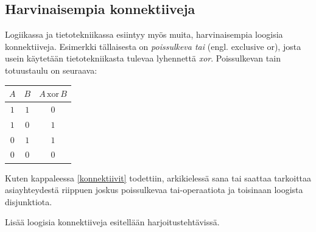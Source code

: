 \subsection*{Harvinaisempia konnektiiveja}%
Logiikassa ja tietotekniikassa esiintyy myös muita, harvinaisempia loogisia konnektiiveja. Esimerkki tällaisesta on {\em poissulkeva tai} (engl. exclusive or), josta usein käytetään tietotekniikasta tulevaa lyhennettä {\em xor}. Poissulkevan tain totuustaulu on seuraava:

\bigskip

\begin{center}
\begin{tabular}{|c|c|c|}\hline
$A$ & $B$ & $A\,\mathrm{xor}\,B$ \\ \hline
$1$ & $1$ & $0$\\ %
$1$ & $0$ & $1$\\
$0$ & $1$ & $1$\\
$0$ & $0$ & $0$\\ \hline
\end{tabular}
\end{center}

\bigskip

Kuten kappaleessa \ref{konnektiivit} todettiin, arkikielessä sana tai saattaa tarkoittaa asiayhteydestä riippuen joskus poissulkevaa tai-operaatiota ja toisinaan loogista disjunktiota.

Lisää loogisia konnektiiveja esitellään harjoitustehtävissä.




\Harjoitustehtavat

